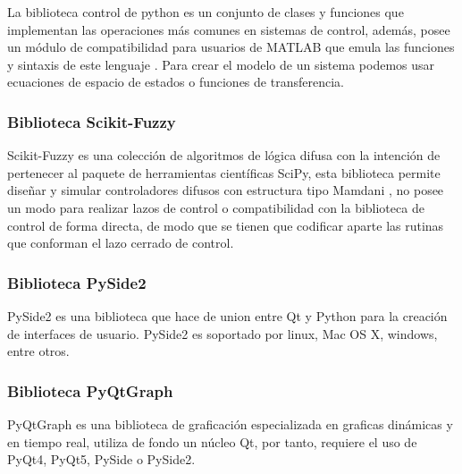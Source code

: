             La biblioteca control de python es un conjunto de clases y funciones que implementan las operaciones más comunes en sistemas de control, además, posee un módulo de compatibilidad para usuarios de MATLAB que emula las funciones y sintaxis de este lenguaje \Parencite{pythoncontrol}. Para crear el modelo de un sistema podemos usar ecuaciones de espacio de estados o funciones de transferencia.

        \subsubsection{Biblioteca Scikit-Fuzzy}
            
            Scikit-Fuzzy es una colección de algoritmos de lógica difusa con la intención de pertenecer al paquete de herramientas científicas SciPy, esta biblioteca permite diseñar y simular controladores difusos con estructura tipo Mamdani \Parencite{warner2016fuzzy}, no posee un modo para realizar lazos de control o compatibilidad con la biblioteca de control de forma directa, de modo que se tienen que codificar aparte las rutinas que conforman el lazo cerrado de control.

        \subsubsection{Biblioteca PySide2}

            PySide2 es una biblioteca que hace de union entre Qt y Python para la creación de interfaces de usuario. PySide2 es soportado por linux, Mac OS X, windows, entre otros.
            
        \subsubsection{Biblioteca PyQtGraph}
                
            PyQtGraph es una biblioteca de graficación especializada en graficas dinámicas y en tiempo real, utiliza de fondo un núcleo Qt, por tanto, requiere el uso de PyQt4, PyQt5, PySide o PySide2.
